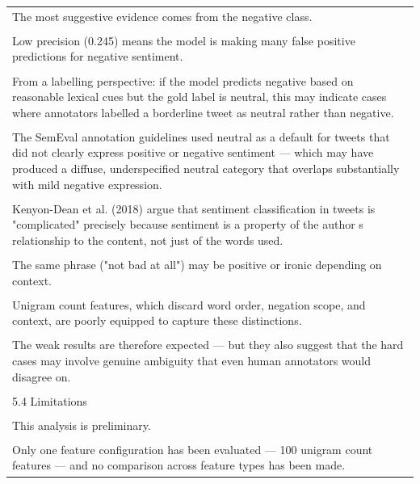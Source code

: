 \documentclass[11pt]{article}
\begin{document}
\begin{longtable}{|p{\dimexpr\linewidth-2\tabcolsep-2\arrayrulewidth\relax}|}
\hline
\rule{0pt}{3.5cm} \\
\hline
The most suggestive evidence comes from the negative class. \\[2pt]
\hline
\rule{0pt}{3.5cm} \\
\hline
Low precision (0.245) means the model is making many false positive predictions for negative sentiment. \\[2pt]
\hline
\rule{0pt}{3.5cm} \\
\hline
From a labelling perspective: if the model predicts negative based on reasonable lexical cues but the gold label is neutral, this may indicate cases where annotators labelled a borderline tweet as neutral rather than negative. \\[2pt]
\hline
\rule{0pt}{3.5cm} \\
\hline
The SemEval annotation guidelines used neutral as a default for tweets that did not clearly express positive or negative sentiment --- which may have produced a diffuse, underspecified neutral category that overlaps substantially with mild negative expression. \\[2pt]
\hline
\rule{0pt}{3.5cm} \\
\hline
Kenyon-Dean et al. (2018) argue that sentiment classification in tweets is "complicated" precisely because sentiment is a property of the author s relationship to the content, not just of the words used. \\[2pt]
\hline
\rule{0pt}{3.5cm} \\
\hline
The same phrase ("not bad at all") may be positive or ironic depending on context. \\[2pt]
\hline
\rule{0pt}{3.5cm} \\
\hline
Unigram count features, which discard word order, negation scope, and context, are poorly equipped to capture these distinctions. \\[2pt]
\hline
\rule{0pt}{3.5cm} \\
\hline
The weak results are therefore expected --- but they also suggest that the hard cases may involve genuine ambiguity that even human annotators would disagree on. \\[2pt]
\hline
\rule{0pt}{3.5cm} \\
\hline
5.4 Limitations \\[2pt]
\hline
\rule{0pt}{3.5cm} \\
\hline
This analysis is preliminary. \\[2pt]
\hline
\rule{0pt}{3.5cm} \\
\hline
Only one feature configuration has been evaluated --- 100 unigram count features --- and no comparison across feature types has been made. \\[2pt]

\end{longtable}
\end{document}
